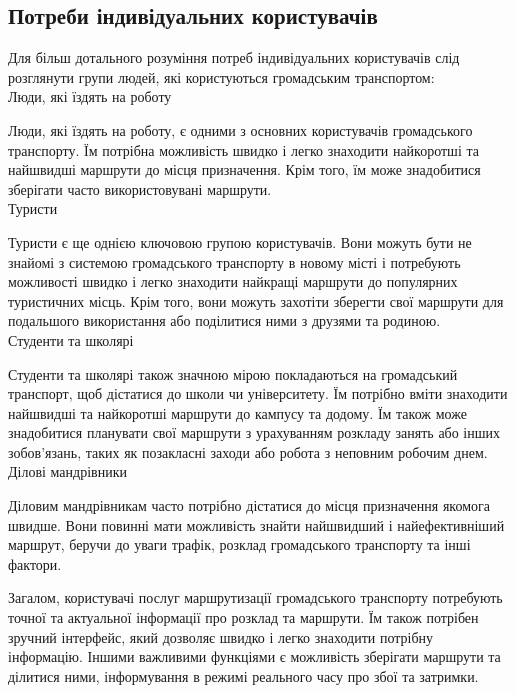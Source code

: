 \subsection{Потреби індивідуальних користувачів}
\label{subsec:individual-users-needs}

Для більш дотального розуміння потреб індивідуальних користувачів слід 
розглянути групи людей, які користуються громадським транспортом:\\

	Люди, які їздять на роботу

    Люди, які їздять на роботу, є одними з основних користувачів громадського транспорту. Їм потрібна можливість швидко і легко знаходити найкоротші та найшвидші маршрути до місця призначення. Крім того, їм може знадобитися зберігати часто використовувані маршрути.\\

    Туристи

    Туристи є ще однією ключовою групою користувачів. Вони можуть бути не знайомі з системою громадського транспорту в новому місті і потребують можливості швидко і легко знаходити найкращі маршрути до популярних туристичних місць. Крім того, вони можуть захотіти зберегти свої маршрути для подальшого використання або поділитися ними з друзями та родиною.\\

    Студенти та школярі

    Студенти та школярі також значною мірою покладаються на громадський транспорт, щоб дістатися до школи чи університету. Їм потрібно вміти знаходити найшвидші та найкоротші маршрути до кампусу та додому. Їм також може знадобитися планувати свої маршрути з урахуванням розкладу занять або інших зобов'язань, таких як позакласні заходи або робота з неповним робочим днем.\\

	Ділові мандрівники

	Діловим мандрівникам часто потрібно дістатися до місця призначення якомога швидше. Вони повинні мати можливість знайти найшвидший і найефективніший маршрут, беручи до уваги трафік, розклад громадського транспорту та інші фактори.


Загалом, користувачі послуг маршрутизації громадського транспорту потребують точної та актуальної інформації про розклад та маршрути. Їм також потрібен зручний інтерфейс, який дозволяє швидко і легко знаходити потрібну інформацію. Іншими важливими функціями є можливість зберігати маршрути та ділитися ними, інформування в режимі реального часу про збої та затримки.